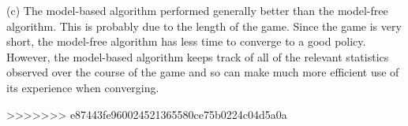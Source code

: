 \documentclass[12pt]{article}
\theoremstyle{remark}
\begin{document}
\noindent (c) The model-based algorithm performed generally better than the model-free algorithm. This is probably due to the length of the game. Since the game is very short, the model-free algorithm has less time to converge to a good policy. However, the model-based algorithm keeps track of all of the relevant statistics observed over the course of the game and so can make much more efficient use of its experience when converging.



>>>>>>> e87443fe960024521365580ce75b0224c04d5a0a
\end{document}
